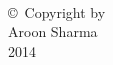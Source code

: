 
\thispagestyle{empty}
\hbox{\ }

\vfill
\renewcommand{\baselinestretch}{1}
\small\normalsize

\vspace{-.65in}

\begin{center}
\large{\copyright \hbox{ }Copyright by\\
Aroon Sharma  %
\\
2014}
\end{center}

\vfill
